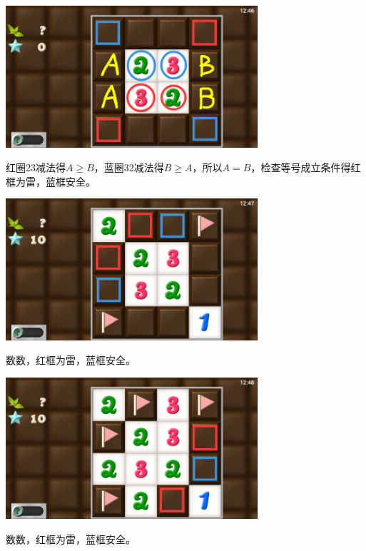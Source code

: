 \subsection{} %
\begin{center}
    \includegraphics[width=0.7\textwidth]{puzzle/135-1.png}
\end{center}
红圈23减法得$A\ge B$，蓝圈32减法得$B\ge A$，所以$A=B$，检查等号成立条件得红框为雷，蓝框安全。
\begin{center}
    \includegraphics[width=0.7\textwidth]{puzzle/135-2.png}
\end{center}
数数，红框为雷，蓝框安全。
\begin{center}
    \includegraphics[width=0.7\textwidth]{puzzle/135-3.png}
\end{center}
数数，红框为雷，蓝框安全。

